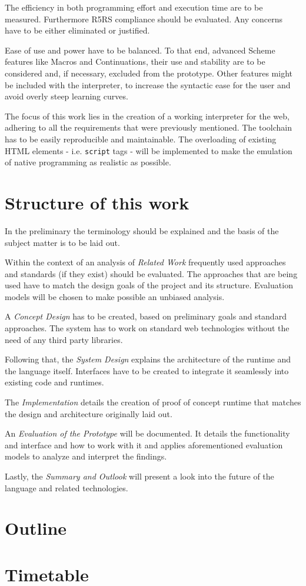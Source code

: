 \documentclass[oneside,11pt,xetex]{scrbook}
\begin{document}
The efficiency in both programming effort and execution time are to be measured. Furthermore R5RS compliance should be evaluated. Any concerns have to be either eliminated or justified.

Ease of use and power have to be balanced. To that end, advanced Scheme features like Macros and Continuations, their use and stability are to be considered and, if necessary, excluded from the prototype. Other features might be included with the interpreter, to increase the syntactic ease for the user and avoid overly steep learning curves.

The focus of this work lies in the creation of a working interpreter for the web, adhering to all the requirements that were previously mentioned. The toolchain has to be easily reproducible and maintainable. The overloading of existing HTML elements - i.e. \texttt{script} tags - will be implemented to make the emulation of native programming as realistic as possible.

\clearpage

\section*{Structure of this work}
In the preliminary the terminology should be explained and the basis of the subject matter is to be laid out.

Within the context of an analysis of \emph{Related Work} frequently used approaches and standards (if they exist) should be evaluated. The approaches that are being used have to match the design goals of the project and its structure. Evaluation models will be chosen to make possible an unbiased analysis.

A \emph{Concept Design} has to be created, based on preliminary goals and standard approaches. The system has to work on standard web technologies without the need of any third party libraries.

Following that, the \emph{System Design} explains the architecture of the runtime and the language itself. Interfaces have to be created to integrate it seamlessly into existing code and runtimes.

The \emph{Implementation} details the creation of proof of concept runtime that matches the design and architecture originally laid out.

An \emph{Evaluation of the Prototype} will be documented. It details the functionality and interface and how to work with it and applies aforementioned evaluation models to analyze and interpret the findings.

Lastly, the \emph{Summary and Outlook} will present a look into the future of the language and related technologies.

\clearpage

\section*{Outline}


\clearpage

\section*{Timetable}

\end{document}
